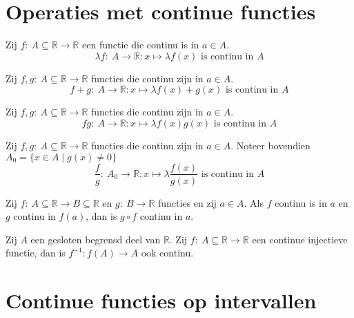 \documentclass[main.tex]{subfiles}
\begin{document}
\section{Operaties met continue functies}
\label{sec:oper-met-cont}

\begin{pr}
  Zij $f:\ A \subseteq \mathbb{R} \rightarrow \mathbb{R}$ een functie die continu is in $a\in A$.
  \[ \lambda f:\ A \rightarrow \mathbb{R}: x \mapsto \lambda f(x) \text{ is continu in } A \]
\end{pr}

\begin{pr}
  Zij $f,g:\ A \subseteq \mathbb{R} \rightarrow \mathbb{R}$ functies die continu zijn in $a\in A$.
  \[ f+g:\ A \rightarrow \mathbb{R}: x \mapsto \lambda f(x)+g(x) \text{ is continu in } A \]
\end{pr}

\begin{pr}
  Zij $f,g:\ A \subseteq \mathbb{R} \rightarrow \mathbb{R}$ functies die continu zijn in $a\in A$.
  \[ fg:\ A \rightarrow \mathbb{R}: x \mapsto \lambda f(x)g(x) \text{ is continu in } A \]
\end{pr}

\begin{pr}
  Zij $f,g:\ A \subseteq \mathbb{R} \rightarrow \mathbb{R}$ functies die continu zijn in $a\in A$.
  Noteer bovendien $A_{0} = \{ x \in A \mid g(x) \neq 0 \}$
  \[ \frac{f}{g}:\ A_{0} \rightarrow \mathbb{R}: x \mapsto \lambda \frac{f(x)}{g(x)} \text{ is continu in } A \]
\end{pr}

\begin{pr}
  Zij $f:\ A \subseteq \mathbb{R} \rightarrow B \subseteq \mathbb{R}$ en $g:\ B \rightarrow \mathbb{R}$ functies en zij $a\in A$.
  Als $f$ continu is in $a$ en $g$ continu in $f(a)$, dan is $g\circ f$ continu in $a$.
\end{pr}

\begin{pr}
  Zij $A$ een gesloten begrensd deel van $\mathbb{R}$.
  Zij $f: \ A \subseteq \mathbb{R} \rightarrow \mathbb{R}$ een continue injectieve functie, dan is $f^{-1}: f(A) \rightarrow A$ ook continu.
\end{pr}

\section{Continue functies op intervallen}
\label{sec:continue-functies-op}
\end{document}
